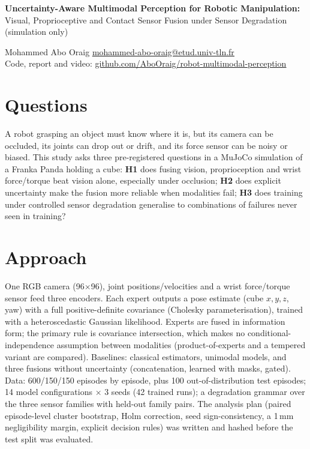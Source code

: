 \documentclass[10pt,a4paper]{article}
\begin{document}
\pagestyle{empty}

\begin{center}
    {\Large \textbf{Uncertainty-Aware Multimodal Perception for Robotic Manipulation:}}\\
    {\large Visual, Proprioceptive and Contact Sensor Fusion under Sensor Degradation\\
    (simulation only)}
\end{center}
Mohammed Abo Oraig \quad\textbar\quad \href{mailto:mohammed-abo-oraig@etud.univ-tln.fr}{\underline{mohammed-abo-oraig@etud.univ-tln.fr}} \\[0.2cm]
Code, report and video: \href{https://github.com/AboOraig/robot-multimodal-perception}{\underline{github.com/AboOraig/robot-multimodal-perception}}

\section*{Questions}
A robot grasping an object must know where it is, but its camera can be occluded, its joints can drop out or drift, and its force sensor can be noisy or biased.
This study asks three pre-registered questions in a MuJoCo simulation of a Franka Panda holding a cube:
\textbf{H1} does fusing vision, proprioception and wrist force/torque beat vision alone, especially under occlusion;
\textbf{H2} does explicit uncertainty make the fusion more reliable when modalities fail;
\textbf{H3} does training under controlled sensor degradation generalise to combinations of failures never seen in training?

\section*{Approach}
One RGB camera (96$\times$96), joint positions/velocities and a wrist force/torque sensor feed three encoders.
Each expert outputs a pose estimate (cube $x,y,z$, yaw) with a full positive-definite covariance (Cholesky parameterisation), trained with a heteroscedastic Gaussian likelihood.
Experts are fused in information form; the primary rule is covariance intersection, which makes no conditional-independence assumption between modalities (product-of-experts and a tempered variant are compared).
Baselines: classical estimators, unimodal models, and three fusions without uncertainty (concatenation, learned with masks, gated).
Data: 600/150/150 episodes by episode, plus 100 out-of-distribution test episodes; 14 model configurations $\times$ 3 seeds (42 trained runs); a degradation grammar over the three sensor families with held-out family pairs.
The analysis plan (paired episode-level cluster bootstrap, Holm correction, seed sign-consistency, a 1\,mm negligibility margin, explicit decision rules) was written and hashed before the test split was evaluated.
\end{document}
